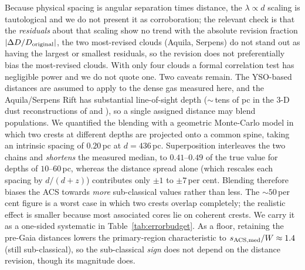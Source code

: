 \documentclass[usenatbib,twoside,twocolumn]{mnras}
\begin{document}
Because physical spacing is angular separation times distance, the $\lambda\propto d$ scaling is tautological and we do not present it as corroboration; the relevant check is that the \emph{residuals} about that scaling show no trend with the absolute revision fraction $|\Delta D/D_{\rm original}|$, the two most-revised clouds (Aquila, Serpens) do not stand out as having the largest or smallest residuals, so the revision does not preferentially bias the most-revised clouds. With only four clouds a formal correlation test has negligible power and we do not quote one. Two caveats remain. The YSO-based distances \citep{Zhang2023} are assumed to apply to the dense gas measured here, and the Aquila/Serpens Rift has substantial line-of-sight depth ($\sim$\,tens of pc in the 3-D dust reconstructions of \citealt{Zucker2020} and \citealt{Green2024}), so a single assigned distance may blend populations. We quantified the blending with a geometric Monte-Carlo model in which two crests at different depths are projected onto a common spine, taking an intrinsic spacing of $0.20$\,pc at $d=436$\,pc. Superposition interleaves the two chains and \emph{shortens} the measured median, to $0.41$--$0.49$ of the true value for depths of $10$--$60$\,pc, whereas the distance spread alone (which rescales each spacing by $d/(d+z)$) contributes only $\pm1$ to $\pm7$\,per cent. Blending therefore biases the ACS towards \emph{more} sub-classical values rather than less. The $\sim50$\,per cent figure is a worst case in which two crests overlap completely; the realistic effect is smaller because most associated cores lie on coherent crests. We carry it as a one-sided systematic in Table~\ref{tab:errorbudget}. As a floor, retaining the pre-Gaia distances lowers the primary-region characteristic to $s_{\rm ACS,med}/W\approx1.4$ (still sub-classical), so the sub-classical \emph{sign} does not depend on the distance revision, though its magnitude does.
\end{document}
